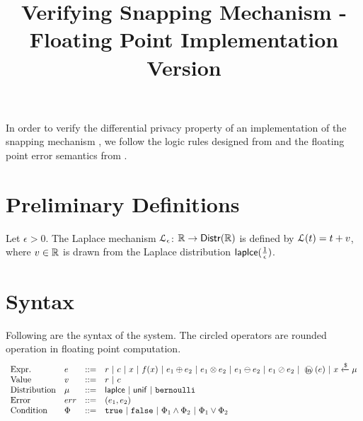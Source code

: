 \documentclass[a4paper,11pt]{article}
\begin{document}
\title{Verifying Snapping Mechanism - Floating Point Implementation Version}
\author{}

\date{}

\maketitle
In order to verify the differential privacy property of an implementation of the snapping mechanism \cite{mironov2012significance}, we follow the logic rules designed from \cite{barthe2016proving} and the floating point error semantics from \cite{Ramananandro2016unified,Martel2006higher,Becker2018verified,Moscato2017Automatic}.

\section{Preliminary Definitions}
\begin{defn}
Let $\epsilon > 0$. The Laplace mechanism  $\mathcal{L}_{\epsilon}$: $\mathbb{R} \to \mathsf{Distr}(\mathbb{R})$ is defined by $\mathcal{L}(t) = t + v$, where $v \in \mathbb{R}$ is drawn from the Laplace distribution $\mathsf{laplce}(\frac{1}{\epsilon})$.
\end{defn}




\section{Syntax}
Following are the syntax of the system. The circled operators are rounded operation in floating point computation.
\[\begin{array}{llll}
\mbox{Expr.} & \expr & ::= & \valr ~|~ \valf
	~|~ x ~|~ f(x) ~|~ \expr_1 \oplus \expr_2 
	~|~ \expr_1 \otimes \expr_2 ~|~ \expr_1 \ominus \expr_2 
	~|~ \expr_1 \oslash \expr_2 ~|~ \oln (\expr) ~|~ x \samplel \edistr \\
%
\mbox{Value} & \valv & ::= & \valr ~|~  \valf \\
%
\mbox{Distribution} & \edistr & ::= & \laplace ~|~ \uniform ~|~ \bernoulli \\ 
%
\mbox{Error} & \err & ::= & (\expr_1, \expr_2) \\

\mbox{Condition} & \condition & ::= & 
	\etrue ~|~ \efalse ~|~ \condition_1 \land \condition_2 
	~|~ \condition_1 \lor \condition_2

\end{array}\]
\end{document}
